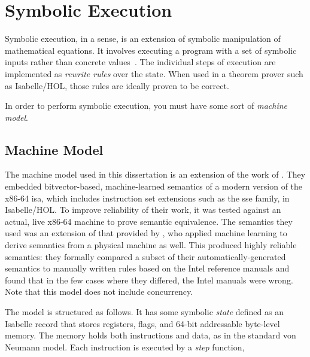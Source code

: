 \chapter{Symbolic Execution}\label{ch:symbolic_execution}



Symbolic execution, in a sense,%
is an extension of symbolic manipulation of mathematical equations.
It involves executing a program with a set of symbolic inputs
rather than concrete values~\citep{king1976symbolic}.
The individual steps of execution are implemented as \emph{rewrite rules}%
over the state.
When used in a theorem prover such as Isabelle/HOL,%
those rules are ideally proven to be correct.

In order to perform symbolic execution, you must have some sort of \emph{machine model}.

\section{Machine Model}\label{se:machine_model}
The machine model used in this dissertation%
is an extension of the work of \citet{roessle2019}.
They embedded bitvector-based, machine-learned semantics
of a modern version of the x86-64 \ac{isa},
which includes instruction set extensions such as the \ac{sse} family, in Isabelle/HOL.
To improve reliability of their work,
it was tested against an actual, live x86-64 machine to prove semantic equivalence.
The semantics they used was an extension of that
provided by \citet{heule2016stratified},
who applied machine learning to derive semantics from a physical machine as well.
This produced highly reliable semantics:
they formally compared a subset of their automatically-generated semantics
to manually written rules based on the Intel reference manuals
and found that in the few cases where they differed, the Intel manuals were wrong.
Note that this model does not include concurrency.

The model is structured as follows.
It has some symbolic \emph{state} defined as an Isabelle record%
that stores registers, flags, and 64-bit addressable byte-level memory.
The memory holds both instructions and data, as in the standard von Neumann model.%
Each instruction is executed by a \emph{step} function,%





